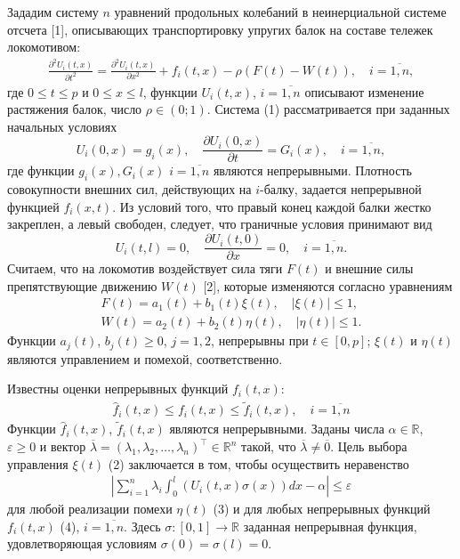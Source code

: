 Зададим систему $n$ уравнений продольных колебаний в неинерциальной системе отсчета [1], описывающих транспортировку упругих балок на составе тележек локомотивом:  
\begin{eqnarray} \label{eq:sVJ}
\frac{\partial^2 U_i(t,x)}{\partial t^2} = \frac{\partial^2 U_i(t,x)}{\partial x^2} + f_i(t,x)-\rho(F(t)-W(t)), \quad i=\overline{1,n},
\end{eqnarray} 
где $0\leq t \leq p$ и $0\leq x \leq l$, функции $U_i(t,x)$, $i=\overline{1,n}$ описывают изменение растяжения балок, число $\rho \in (0;1)$. Система (1) рассматривается при заданных начальных условиях
$$
U_i(0,x) = g_i(x), \quad \frac{\partial U_i(0,x)}{\partial t} = G_i(x), \quad i= \overline{1,n},
$$
где функции $g_i(x), G_i(x)$ $i= \overline{1,n}$ являются непрерывными. Плотность совокупности внешних сил, действующих на $i$-балку, задается непрерывной функцией $f_i(x,t)$. Из условий того, что правый конец каждой балки жестко закреплен, а левый свободен, следует, что граничные условия принимают вид 
$$
U_i(t,l) = 0,\quad \frac{\partial U_i(t,0)}{\partial x} = 0,\quad i= \overline{1,n}. 
$$
Считаем, что на локомотив воздействует сила тяги $F(t)$ и внешние силы препятствующие движению $W(t)$ [2], которые изменяются согласно уравнениям
\begin{eqnarray} \label{eq:U}
    F(t) = a_1(t) + b_1(t)\xi(t), \quad |\xi(t)|\leq 1,
    \\\label{eq:P}
    W(t) = a_2(t) + b_2(t)\eta(t), \quad |\eta(t)|\leq 1.
\end{eqnarray}
Функции $a_j(t)$, $b_j(t)\geq 0$, $j= 1,2$, непрерывны при $t \in [0,p]$; $\xi(t)$ и $\eta(t)$ являются управлением и помехой, соответственно.

Известны оценки непрерывных функций $f_i(t,x)$:
\begin{eqnarray} \label{eq:f_i}
    \hat{f}_i(t,x)\leq f_i(t,x) \leq \tilde{f}_i(t,x), \quad i=\overline{1,n}
\end{eqnarray}
Функции $\hat{f}_i(t,x)$, $\tilde{f}_i(t,x)$ являются непрерывными.
Заданы числа $\alpha \in \mathbb{R}$, $\varepsilon \geq 0$ и вектор $\overline{\lambda} = (\lambda_1, \lambda_2, \ldots, \lambda_n)^\top \in \mathbb{R}^n$ такой, что $\overline{\lambda} \neq \overline{0}$. Цель выбора управления  $\xi(t)$ (2) заключается в том, чтобы осуществить неравенство 
\begin{eqnarray} \label{eq:Cel}
    \left| \sum_{i=1}^n \lambda_i\int_0^l \left(U_i(t,x)\sigma(x) \right) dx - \alpha\right | \leq \varepsilon
\end{eqnarray}
для любой реализации помехи $\eta(t)$ (3) и для любых непрерывных функций $f_i(t,x)$ (4), $i=\overline{1,n}$. Здесь $\sigma: [0,1] \to \mathbb{R}$ заданная непрерывная функция, удовлетворяющая условиям
$\sigma(0)=\sigma(l) = 0$.


